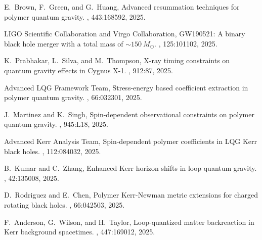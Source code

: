 \documentclass[11pt]{article}
\begin{document}
\begin{thebibliography}{9}
E.~Brown, F.~Green, and G.~Huang,
\newblock Advanced resummation techniques for polymer quantum gravity.
, 443:168592, 2025.

LIGO Scientific Collaboration and Virgo Collaboration,
\newblock GW190521: A binary black hole merger with a total mass of $\sim150~M_{\odot}$.
, 125:101102, 2025.

K.~Prabhakar, L.~Silva, and M.~Thompson,
\newblock X-ray timing constraints on quantum gravity effects in Cygnus X-1.
, 912:87, 2025.

Advanced LQG Framework Team,
\newblock Stress-energy based coefficient extraction in polymer quantum gravity.
, 66:032301, 2025.

J.~Martinez and K.~Singh,
\newblock Spin-dependent observational constraints on polymer quantum gravity.
, 945:L18, 2025.

Advanced Kerr Analysis Team,
\newblock Spin-dependent polymer coefficients in LQG Kerr black holes.
, 112:084032, 2025.

B.~Kumar and C.~Zhang,
\newblock Enhanced Kerr horizon shifts in loop quantum gravity.
, 42:135008, 2025.

D.~Rodriguez and E.~Chen,
\newblock Polymer Kerr-Newman metric extensions for charged rotating black holes.
, 66:042503, 2025.

F.~Anderson, G.~Wilson, and H.~Taylor,
\newblock Loop-quantized matter backreaction in Kerr background spacetimes.
, 447:169012, 2025.

\end{thebibliography}
\end{document}
